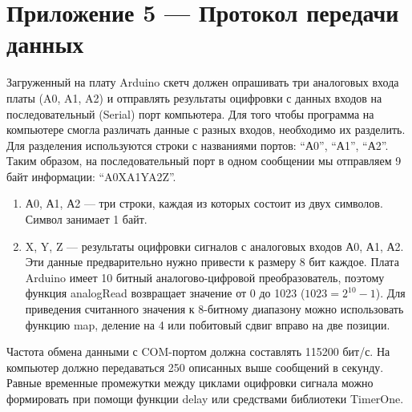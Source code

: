 \section*{Приложение 5 — Протокол передачи данных}

Загруженный на плату Arduino скетч должен опрашивать три аналоговых входа платы  (A0, A1, A2) и отправлять результаты оцифровки с данных входов на последовательный (Serial) порт компьютера. Для того чтобы программа на компьютере смогла различать данные с разных входов, необходимо их разделить. Для разделения используются строки с названиями портов: “А0”, “А1”, “А2”. Таким образом, на последовательный порт в одном сообщении мы отправляем 9 байт информации: “A0XA1YA2Z”.

\begin{enumerate}
\item А0, А1, А2 — три строки, каждая из которых состоит из двух символов. Символ занимает 1 байт. 
\item X, Y, Z — результаты оцифровки сигналов с аналоговых входов А0, А1, А2. Эти данные предварительно нужно привести к размеру 8 бит каждое. Плата Arduino имеет 10 битный аналогово-цифровой преобразователь, поэтому функция analogRead возвращает значение от 0 до 1023 ($1023 = 2^{10}-1$). Для приведения считанного значения к 8-битному диапазону можно использовать функцию map, деление на 4 или побитовый сдвиг вправо на две позиции.
\end{enumerate}

Частота обмена данными с COM-портом должна составлять 115200 бит/с. На компьютер должно передаваться 250 описанных выше сообщений в секунду. Равные временные промежутки между циклами оцифровки сигнала можно формировать при помощи функции delay или средствами библиотеки TimerOne.